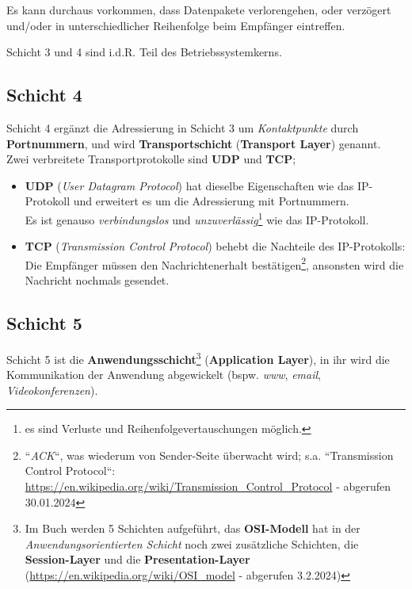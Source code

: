 \noindent
Es kann durchaus vorkommen, dass Datenpakete verlorengehen, oder verzögert und/oder in unterschiedlicher Reihenfolge beim Empfänger eintreffen.

\begin{tcolorbox}[enlarge top by=0.5cm,enlarge bottom by=0.5cm]
    Schicht 3 und 4 sind i.d.R. Teil des Betriebssystemkerns.
\end{tcolorbox}

\subsection*{Schicht 4}
Schicht 4 ergänzt die Adressierung in Schicht 3 um \textit{Kontaktpunkte} durch \textbf{Portnummern}, und wird \textbf{Transportschicht} (\textbf{Transport Layer}) genannt.\\

\noindent
Zwei verbreitete Transportprotokolle sind \textbf{UDP} und \textbf{TCP};

\begin{itemize}
    \item \textbf{UDP} (\textit{User Datagram Protocol}) hat dieselbe Eigenschaften wie das IP-Protokoll und erweitert es um die Adressierung mit Portnummern.\\
    Es ist genauso   \textit{verbindungslos} und \textit{unzuverlässig}\footnote{
    es sind Verluste und Reihenfolgevertauschungen möglich.
    } wie das IP-Protokoll.
    \item \textbf{TCP} (\textit{Transmission Control Protocol}) behebt die Nachteile des IP-Protokolls: Die Empfänger müssen den Nachrichtenerhalt bestätigen\footnote{ ``\textit{ACK}``,
    was wiederum von Sender-Seite überwacht wird; s.a. ``Transmission Control Protocol``: \url{https://en.wikipedia.org/wiki/Transmission_Control_Protocol} - abgerufen 30.01.2024
    }, ansonsten wird die Nachricht nochmals gesendet.
\end{itemize}


\subsection*{Schicht 5}
Schicht 5 ist die \textbf{Anwendungsschicht}\footnote{
    Im Buch werden 5 Schichten aufgeführt, das \textbf{OSI-Modell} hat in der \textit{Anwendungsorientierten Schicht} noch zwei zusätzliche Schichten, die \textbf{Session-Layer} und die \textbf{Presentation-Layer} (\url{https://en.wikipedia.org/wiki/OSI_model} - abgerufen 3.2.2024)
} (\textbf{Application Layer}), in ihr wird die Kommunikation der Anwendung abgewickelt (bspw. \textit{www}, \textit{email}, \textit{Videokonferenzen}).

